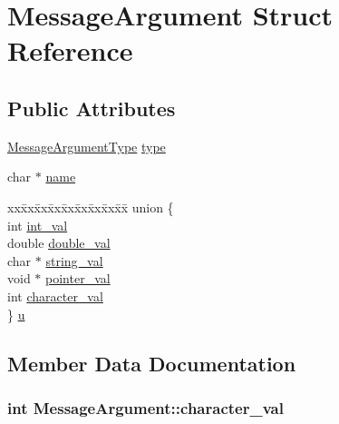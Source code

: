 \hypertarget{struct_message_argument}{}\section{Message\+Argument Struct Reference}
\label{struct_message_argument}
\subsection*{Public Attributes}
\begin{DoxyCompactItemize}
\item 
\hyperlink{crowbar_8h_aa3bc7ab05aa3429f1f651ceabdc1be5e}{Message\+Argument\+Type} \hyperlink{struct_message_argument_ab4edae149a46b949d311508db068c999}{type}
\item 
char $\ast$ \hyperlink{struct_message_argument_afd2a134151e6db0d2f213db77cb2e36e}{name}
\item 
\begin{tabbing}
xx\=xx\=xx\=xx\=xx\=xx\=xx\=xx\=xx\=\kill
union \{\\
\>int \hyperlink{struct_message_argument_aecc4f24e519f40ff86284a2b73ef1bc8}{int\_val}\\
\>double \hyperlink{struct_message_argument_ab7f5dc20ff83d99c8556566cddc96647}{double\_val}\\
\>char $\ast$ \hyperlink{struct_message_argument_ae41f3e1492fcd9d8df1706e6e4958874}{string\_val}\\
\>void $\ast$ \hyperlink{struct_message_argument_a43017c0c8915b94ad150fbe4c1f4b02d}{pointer\_val}\\
\>int \hyperlink{struct_message_argument_a7df779277c1b7a79e117b23edecb3caa}{character\_val}\\
\} \hyperlink{struct_message_argument_a9ca164b976d87645797abcca00269976}{u}\\

\end{tabbing}\end{DoxyCompactItemize}


\subsection{Member Data Documentation}
\hypertarget{struct_message_argument_a7df779277c1b7a79e117b23edecb3caa}{}
\subsubsection[{character\+\_\+val}]{\setlength{\rightskip}{0pt plus 5cm}int Message\+Argument\+::character\+\_\+val}\label{struct_message_argument_a7df779277c1b7a79e117b23edecb3caa}
\hypertarget{struct_message_argument_ab7f5dc20ff83d99c8556566cddc96647}{}
